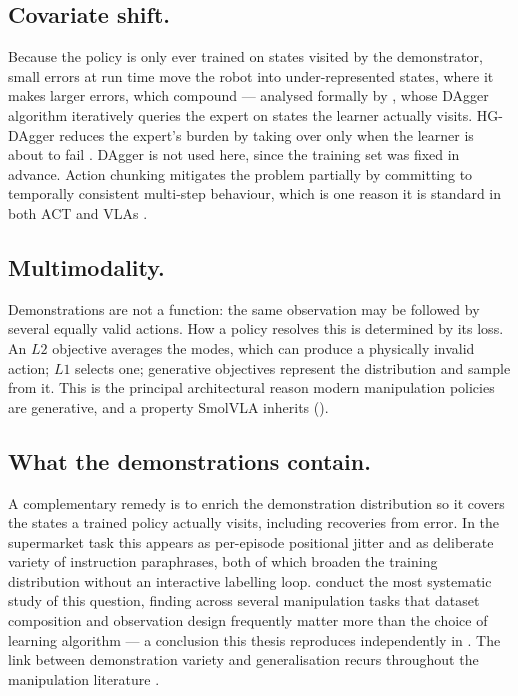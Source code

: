 \subsection{Covariate shift.} Because the policy is only ever trained on states visited
by the demonstrator, small errors at run time move the robot into under-represented
states, where it makes larger errors, which compound --- analysed formally by
\textcite{ross2011dagger}, whose DAgger algorithm iteratively queries the expert on
states the learner actually visits. HG-DAgger reduces the expert's burden by taking over
only when the learner is about to fail \parencite{kelly2019hgdagger}. DAgger is not used
here, since the training set was fixed in advance. Action chunking mitigates the problem
partially by committing to temporally consistent multi-step behaviour, which is one
reason it is standard in both ACT and VLAs
\parencite{zhao2023act, li2025qchunking}.

\subsection{Multimodality.} Demonstrations are not a function: the same observation may
be followed by several equally valid actions. How a policy resolves this is determined
by its loss. An $L2$ objective averages the modes, which can produce a physically
invalid action; $L1$ selects one; generative objectives
\parencite{chi2023diffusionpolicy, lipman2023flowmatching} represent the distribution
and sample from it. This is the principal architectural reason modern manipulation
policies are generative, and a property SmolVLA inherits ().

\subsection{What the demonstrations contain.} A complementary remedy is to enrich the
demonstration distribution so it covers the states a trained policy actually visits,
including recoveries from error. In the supermarket task this appears as per-episode
positional jitter and as deliberate variety of instruction paraphrases, both of which
broaden the training distribution without an interactive labelling loop.
\textcite{mandlekar2021robomimic} conduct the most systematic study of this question,
finding across several manipulation tasks that dataset composition and observation
design frequently matter more than the choice of learning algorithm --- a conclusion
this thesis reproduces independently in . The link between
demonstration variety and generalisation recurs throughout the manipulation literature
\parencite{bharadhwaj2024roboagent, black2025pi05, lin2025datascaling}.


